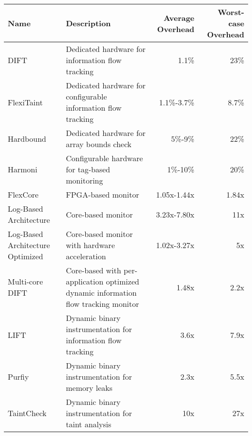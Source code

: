 \begin{tabular}{|l|p{2in}|r|r|}

\hline
{\bf Name} & {\bf Description} & {\bf Average Overhead} & {\bf Worst-case Overhead} \\ \hline\hline

DIFT \cite{dift-asplos04} & Dedicated hardware for information flow tracking & 1.1\% & 23\% \\ \hline
FlexiTaint \cite{flexitaint-hpca08} & Dedicated hardware for configurable information flow tracking & 1.1\%-3.7\% & 8.7\% \\ \hline
Hardbound \cite{hardbound-asplos08} & Dedicated hardware for array bounds check & 5\%-9\% & 22\% \\ \hline
Harmoni \cite{harmoni-dsn12} & Configurable hardware for tag-based monitoring & 1\%-10\% & 20\% \\ \hline\hline

FlexCore \cite{flexcore-micro10} & FPGA-based monitor & 1.05x-1.44x & 1.84x \\ \hline
Log-Based Architecture \cite{lba-asid06} & Core-based monitor & 3.23x-7.80x & 11x \\ \hline
Log-Based Architecture Optimized \cite{lba-isca08} & Core-based monitor with hardware acceleration  & 1.02x-3.27x & 5x \\ \hline
Multi-core DIFT \cite{nagarajan-interact08} & Core-based with per-application optimized dynamic information flow tracking monitor & 1.48x & 2.2x \\ \hline\hline

LIFT \cite{lift-micro06} & Dynamic binary instrumentation for information flow tracking & 3.6x & 7.9x \\ \hline
Purfiy \cite{purify-usenix92} & Dynamic binary instrumentation for memory leaks & 2.3x & 5.5x \\ \hline
TaintCheck \cite{taintcheck-05} & Dynamic binary instrumentation for taint analysis & 10x & 27x \\ \hline


\end{tabular}
